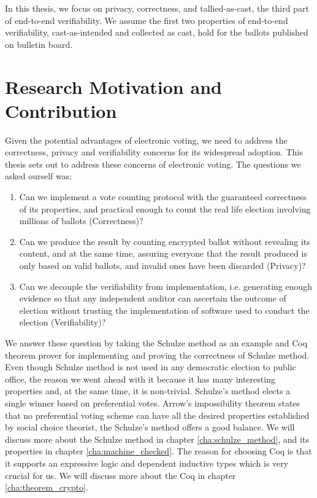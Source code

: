 In this thesis, we focus on privacy, correctness, and tallied-as-cast, the third part of end-to-end verifiability.
We assume the first two properties of end-to-end verifiability, cast-as-intended and collected as cast, hold
for the ballots published on bulletin board. 

\section{Research Motivation and Contribution}
Given the potential advantages of electronic voting,  we need to address
the correctness, privacy and verifiability concerns for its widespread adoption. 
This thesis sets out to address these concerns of electronic voting. 
The questions we asked ourself was:
 \begin{enumerate} 
  \item Can we implement a vote counting protocol with the  
    guaranteed correctness of its properties, and practical enough
    to count the real life election involving millions of ballots (Correctness)?
  \item Can we produce the result by counting encrypted ballot without revealing 
  its content, and at the same time, 
  assuring everyone that the result produced is only based on valid ballots, 
  and invalid ones have been discarded  (Privacy)?
 \item Can we decouple the verifiability from implementation, i.e. 
    generating enough evidence so that any independent auditor can 
    ascertain the outcome of election without trusting the implementation 
    of software used to conduct the election (Verifiability)?
  \end{enumerate}

\noindent
We answer these question by taking the Schulze method \citep{Schulze:2011:NMC} 
as an example and Coq \citep{Bertot:2004:ITP}
theorem prover  for implementing and proving the correctness of  Schulze method.
Even though Schulze method is not used in any democratic election to public office, the reason 
 we went ahead with it because it has many interesting properties and, 
 at the same time, it is non-trivial.   Schulze's method elects  a single winner based on 
preferential votes.  Arrow's impossibility theorem \citep{Arrow:1950:DCS} states
 that no preferential voting 
scheme can have all the desired properties established by  social choice theorist,
the Schulze's method offers a good balance. We will discuss more about the Schulze method in 
chapter \ref{cha:schulze_method}, and its properties in chapter \ref{cha:machine_checked}. 
The reason for choosing Coq is that it supports an expressive logic and dependent 
inductive types which is very crucial for us. We will discuss more about the Coq in 
chapter \ref{cha:theorem_crypto}.

